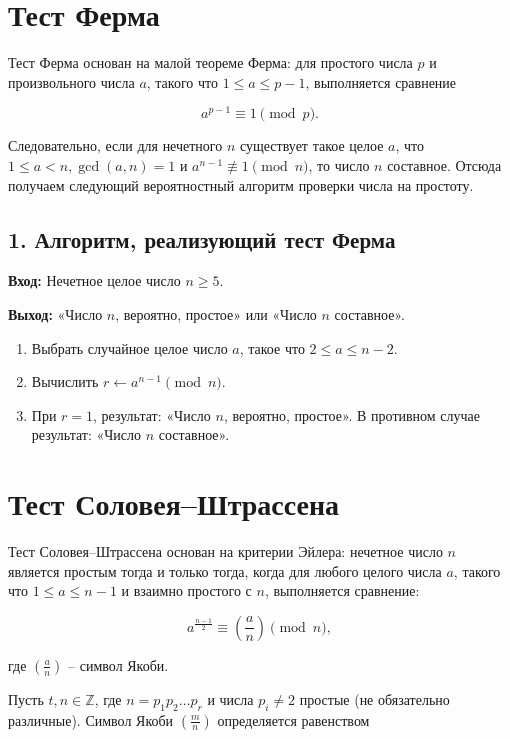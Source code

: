 \documentclass{article}
\begin{document}
\section*{Тест Ферма}

Тест Ферма основан на малой теореме Ферма: для простого числа \( p \) и произвольного числа \( a \), такого что \( 1 \leq a \leq p - 1 \), выполняется сравнение

\[
a^{p-1} \equiv 1 \pmod{p}.
\]

Следовательно, если для нечетного \( n \) существует такое целое \( a \), что \( 1 \leq a < n, \gcd(a, n) = 1 \) и \( a^{n-1} \not\equiv 1 \pmod{n} \), то число \( n \) составное. Отсюда получаем следующий вероятностный алгоритм проверки числа на простоту.

\subsection*{1. Алгоритм, реализующий тест Ферма}

\textbf{Вход:} Нечетное целое число \( n \geq 5 \).  

\textbf{Выход:} «Число \( n \), вероятно, простое» или «Число \( n \) составное».

\begin{enumerate}
    \item Выбрать случайное целое число \( a \), такое что \( 2 \leq a \leq n - 2 \).
    \item Вычислить \( r \gets a^{n-1} \pmod{n} \).
    \item При \( r = 1 \), результат: «Число \( n \), вероятно, простое». В противном случае результат: «Число \( n \) составное».
\end{enumerate}

\section*{Тест Соловея–Штрассена}

Тест Соловея–Штрассена основан на критерии Эйлера: нечетное число \( n \) является простым тогда и только тогда, когда для любого целого числа \( a \), такого что \( 1 \leq a \leq n - 1 \) и взаимно простого с \( n \), выполняется сравнение:

\[
a^{\frac{n-1}{2}} \equiv \left( \frac{a}{n} \right) \pmod{n},
\]

где \( \left( \frac{a}{n} \right) \) – символ Якоби.

Пусть \( t, n \in \mathbb{Z} \), где \( n = p_1 p_2 \ldots p_r \) и числа \( p_i \neq 2 \) простые (не обязательно различные). Символ Якоби \( \left( \frac{m}{n} \right) \) определяется равенством
\end{document}

